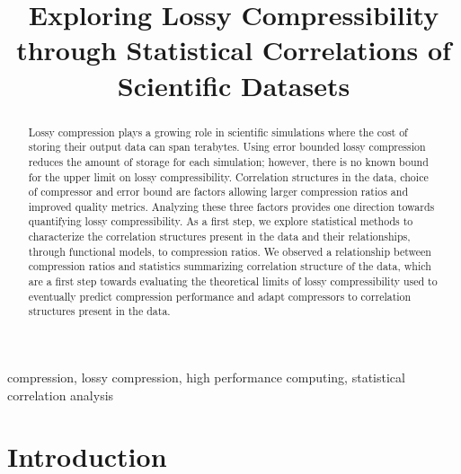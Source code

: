 \documentclass[conference]{IEEEtran}
\begin{document}
\title{Exploring Lossy Compressibility through Statistical Correlations of Scientific Datasets}

\author{

}


\maketitle

\begin{abstract}
Lossy compression plays a growing role in scientific simulations where the cost of storing their output data can span terabytes. Using error bounded lossy compression reduces the amount of storage for each simulation; however, there is no known bound for the upper limit on lossy compressibility. Correlation structures in the data, choice of compressor and error bound are factors allowing larger compression ratios and improved quality metrics. Analyzing these three factors provides one direction towards quantifying lossy compressibility. As a first step,  we explore statistical methods to characterize the correlation structures present in the data and their relationships, through functional models, to compression ratios. We observed a relationship between compression ratios and statistics summarizing correlation structure of the data, which are a first step towards evaluating the theoretical limits of lossy compressibility used to eventually predict compression performance and adapt compressors to correlation structures present in the data. 
\end{abstract}

\begin{IEEEkeywords}
compression, lossy compression, high performance computing, statistical correlation analysis
\end{IEEEkeywords}

\section{Introduction}
\end{document}
